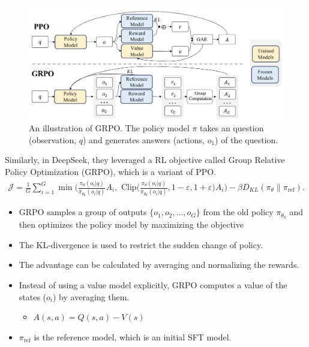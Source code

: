 \begin{figure}[t]
	\centering
	\includegraphics[scale=0.5]{./images/DeepSeek/grpo.png}
	\caption{An illustration of GRPO. The policy model $\pi$ takes an question (\ie observation, $q$) and generates answers (\ie actions, $o_1$) of the question. }
\end{figure}

Similarly, in DeepSeek, they leveraged a RL objective called Group Relative Policy Optimization (GRPO), which is a variant of PPO. 
\begin{align*}
	\mathcal{J} = \frac{1}{G}\sum_{i=1}^{G} \min \Bigg(\frac{\pi_{\theta}\left(o_i | q\right)}{\pi_{\theta_{\text {k}}}\left(o_i | q\right)} A_i, \textrm{ Clip}\Bigg(\frac{\pi_{\theta}\left(o_i | q\right)}{\pi_{\theta_{\text {k}}}\left(o_i | q\right)}, 1-\varepsilon, 1+\varepsilon\Bigg) A_{i}\Bigg) -\beta D_{KL}(\pi_{\theta}\| \pi_{\text{ref}}).
\end{align*}
\begin{itemize}
	\item GRPO samples a group of outputs $\{o_1, o_2,\dots, o_G \}$ from the old policy $\pi_{\theta_k}$ and then optimizes the policy model by maximizing the objective 
	\item The KL-divergence is used to restrict the sudden change of policy.
	\item The advantage can be calculated by averaging and normalizing the rewards.
	\item Instead of using a value model explicitly, GRPO computes a value of the states (\ie $o_i$) by averaging them. 
		\begin{itemize}
			\item $A(s,a) = Q(s,a)-V(s)$
		\end{itemize}
	\item $\pi_{\text{ref}}$ is the reference model, which is an initial SFT model. 
\end{itemize}

